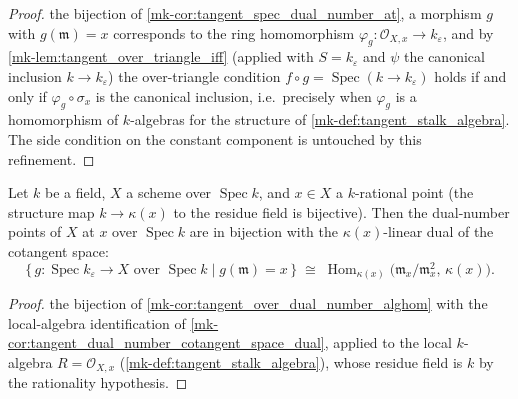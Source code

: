\begin{proof}
  \leanokUnder the bijection of \ref{mk-cor:tangent_spec_dual_number_at},
  a morphism \(g\) with \(g(\mathfrak m) = x\) corresponds to the ring
  homomorphism \(\varphi_g : \mathcal O_{X,x} \to k_\varepsilon\), and
  by \ref{mk-lem:tangent_over_triangle_iff} (applied with
  \(S = k_\varepsilon\) and \(\psi\) the canonical inclusion
  \(k \to k_\varepsilon\)) the over-triangle condition
  \(f \circ g = \operatorname{Spec}(k \to k_\varepsilon)\) holds if and
  only if \(\varphi_g \circ \sigma_x\) is the canonical inclusion,
  i.e.\ precisely when \(\varphi_g\) is a homomorphism of
  \(k\)-algebras for the structure of
  \ref{mk-def:tangent_stalk_algebra}. The side condition on the constant
  component is untouched by this refinement.
\end{proof}

\begin{theorem}\label{mk-thm:tangent_over_dual_number_cotangent_dual}
  \leanok

  Let \(k\) be a field, \(X\) a scheme over \(\operatorname{Spec} k\),
  and \(x \in X\) a \(k\)-rational point (the structure map
  \(k \to \kappa(x)\) to the residue field is bijective). Then the
  dual-number points of \(X\) at \(x\) over \(\operatorname{Spec} k\)
  are in bijection with the \(\kappa(x)\)-linear dual of the cotangent
  space:
  \[
    \{\, g : \operatorname{Spec} k_\varepsilon \to X
        \text{ over } \operatorname{Spec} k
        \mid g(\mathfrak m) = x \,\}
    \;\cong\;
    \operatorname{Hom}_{\kappa(x)}\!\bigl(\mathfrak m_x/\mathfrak m_x^2,\,
      \kappa(x)\bigr).
  \]
\end{theorem}

\begin{proof}
  \leanokCompose the bijection of \ref{mk-cor:tangent_over_dual_number_alghom}
  with the local-algebra identification of
  \ref{mk-cor:tangent_dual_number_cotangent_space_dual}, applied to the
  local \(k\)-algebra \(R = \mathcal O_{X,x}\)
  (\ref{mk-def:tangent_stalk_algebra}), whose residue field is \(k\) by
  the rationality hypothesis.
\end{proof}

